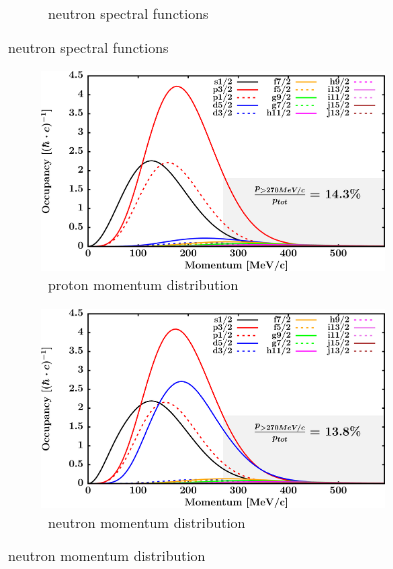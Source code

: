 \begin{figure}[hbtp]
\begin{subfigure}[b]{0.45\textwidth}
        \caption{\oEight\ neutron spectral functions}
        \label{DOMFitData_o18_neutron_spectralFunctions}
    \end{subfigure}
\end{figure}
\afterpage{\clearpage}
\begin{figure}[hbtp]
    \captionsetup[subfigure]{labelformat=empty}
    \centering
    \begin{subfigure}[b]{0.45\textwidth}
        \centering
        \includegraphics[width=\linewidth]{figures/o18_protonLJMomentumDistIntegral.png}
        \caption{\oEight\ proton momentum distribution}
        \label{DOMFitData_o18_proton_momentumDist}
    \end{subfigure}\hspace{6pt}
    \begin{subfigure}[b]{0.45\textwidth}
        \centering
        \includegraphics[width=\linewidth]{figures/o18_neutronLJMomentumDistIntegral.png}
        \caption{\oEight\ neutron momentum distribution}
        \label{DOMFitData_o18_neutron_momentumDist}
    \end{subfigure}\vspace{0.3in}

\end{figure}

